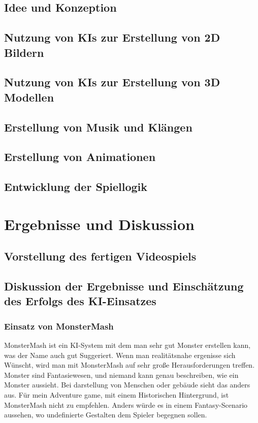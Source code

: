 \documentclass[12pt,a4paper,bibliography=totocnumbered,listof=totocnumbered]{scrartcl}
\begin{document}
\subsection {Idee und Konzeption}
\subsection{Nutzung von KIs zur Erstellung von 2D Bildern}
\subsection{Nutzung von KIs zur Erstellung von 3D Modellen}
\subsection{Erstellung von Musik und Klängen}
\subsection{Erstellung von Animationen}
\subsection{Entwicklung der Spiellogik}

\section{Ergebnisse und Diskussion}
\subsection{Vorstellung des fertigen Videospiels}
\subsection{Diskussion der Ergebnisse und Einschätzung des Erfolgs des KI-Einsatzes}
\subsubsection{Einsatz von MonsterMash}
	MonsterMash ist ein KI-System mit dem man sehr gut Monster erstellen kann, was der Name auch gut Suggeriert. Wenn man realitätsnahe ergenisse sich Wünscht, wird man mit MonsterMash auf sehr große Herausforderungen treffen. Monster sind Fantasiewesen, und niemand kann genau beschreiben, wie ein Monster aussieht. Bei darstellung von Menschen oder gebäude sieht das anders aus. Für mein Adventure game, mit einem Historischen Hintergrund, ist MonsterMash nicht zu empfehlen. Anders würde es in einem Fantasy-Scenario aussehen, wo undefinierte Gestalten dem Spieler begegnen sollen.
\end{document}
